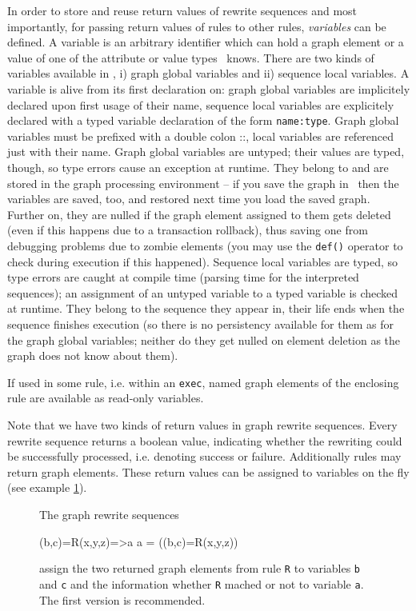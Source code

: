 In order to store and reuse return values of rewrite sequences and most importantly, 
for passing return values of rules to other rules, \emph{variables} can be defined.
A variable is an arbitrary identifier which can hold a graph element or a value of one of the attribute or value types \GrG\ knows.
There are two kinds of variables available in \GrG,
i) graph global variables and 
ii) sequence local variables.
A variable is alive from its first declaration on: graph global variables are implicitely declared upon first usage of their name,
sequence local variables are explicitely declared with a typed variable declaration of the form \texttt{name:type}.
Graph global variables must be prefixed with a double colon ::, local variables are referenced just with their name.
Graph global variables are untyped; their values are typed, though, so type errors cause an exception at runtime.
They belong to and are stored in the graph processing environment -- if you save the graph in \GrShell\ 
then the variables are saved, too, and restored next time you load the saved graph.
Further on, they are nulled if the graph element assigned to them gets deleted (even if this happens due to a transaction rollback),
thus saving one from debugging problems due to zombie elements (you may use the \texttt{def()} operator to check during execution if this happened).
Sequence local variables are typed, so type errors are caught at compile time (parsing time for the interpreted sequences); 
an assignment of an untyped variable to a typed variable is checked at runtime.
They belong to the sequence they appear in, their life ends when the sequence finishes execution 
(so there is no persistency available for them as for the graph global variables; neither do they get nulled on element deletion as the graph does not know about them). 

If used in some rule, i.e. within an \texttt{exec}, named graph elements of the enclosing rule are available as read-only variables.

Note that we have two kinds of return values in graph rewrite sequences.
Every rewrite sequence returns a boolean value, indicating whether the rewriting could be successfully processed, i.e. denoting success or failure.
Additionally rules may return graph elements.
These return values can be assigned to variables on the fly (see example \ref{ex:grsreturn}).
\begin{figure}[htbp]
\begin{example}
	\label{ex:grsreturn}
The graph rewrite sequences
	\begin{grgen}	 
(b,c)=R(x,y,z)=>a
a = ((b,c)=R(x,y,z))
	\end{grgen}
assign the two returned graph elements from rule \texttt{R} to variables \texttt{b} and \texttt{c} and the information whether \texttt{R} mached or not to variable \texttt{a}. The first version is recommended.
\end{example}
\end{figure}


